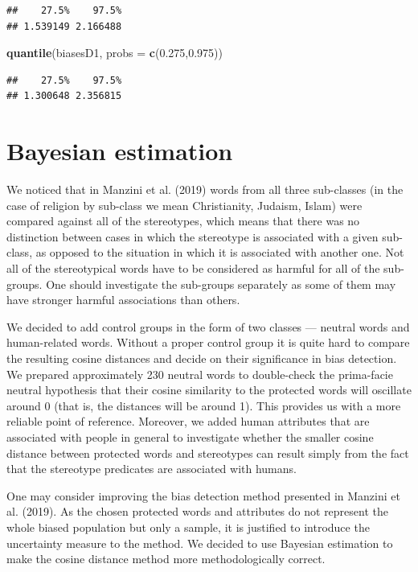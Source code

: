 \documentclass[10pt,dvipsnames,enabledeprecatedfontcommands]{scrartcl}
\newenvironment{Shaded}{\begin{snugshade}}{\end{snugshade}}
\newcommand{\KeywordTok}[1]{\textcolor[rgb]{0.13,0.29,0.53}{\textbf{#1}}}
\newcommand{\DataTypeTok}[1]{\textcolor[rgb]{0.13,0.29,0.53}{#1}}
\newcommand{\FloatTok}[1]{\textcolor[rgb]{0.00,0.00,0.81}{#1}}
\newcommand{\NormalTok}[1]{#1}
\begin{document}
\begin{verbatim}
##    27.5%    97.5% 
## 1.539149 2.166488
\end{verbatim}

\begin{Shaded}
\begin{Highlighting}[]
\KeywordTok{quantile}\NormalTok{(biasesD1, }\DataTypeTok{probs =} \KeywordTok{c}\NormalTok{(}\FloatTok{0.275}\NormalTok{,}\FloatTok{0.975}\NormalTok{))}
\end{Highlighting}
\end{Shaded}

\begin{verbatim}
##    27.5%    97.5% 
## 1.300648 2.356815
\end{verbatim}

\normalsize

\section{Bayesian estimation}\label{bayesian-estimation}

We noticed that in Manzini et al. (2019) words from all three
sub-classes (in the case of religion by sub-class we mean Christianity,
Judaism, Islam) were compared against all of the stereotypes, which
means that there was no distinction between cases in which the
stereotype is associated with a given sub-class, as opposed to the
situation in which it is associated with another one. Not all of the
stereotypical words have to be considered as harmful for all of the
sub-groups. One should investigate the sub-groups separately as some of
them may have stronger harmful associations than others.

We decided to add control groups in the form of two classes --- neutral
words and human-related words. Without a proper control group it is
quite hard to compare the resulting cosine distances and decide on their
significance in bias detection. We prepared approximately 230 neutral
words to double-check the prima-facie neutral hypothesis that their
cosine similarity to the protected words will oscillate around 0 (that
is, the distances will be around 1). This provides us with a more
reliable point of reference. Moreover, we added human attributes that
are associated with people in general to investigate whether the smaller
cosine distance between protected words and stereotypes can result
simply from the fact that the stereotype predicates are associated with
humans.

One may consider improving the bias detection method presented in
Manzini et al. (2019). As the chosen protected words and attributes do
not represent the whole biased population but only a sample, it is
justified to introduce the uncertainty measure to the method. We decided
to use Bayesian estimation to make the cosine distance method more
methodologically correct.
\end{document}
